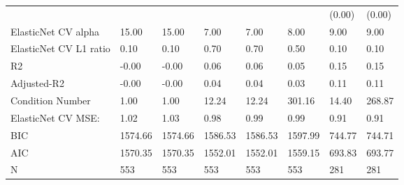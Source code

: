 \begin{table}
\begin{center}
\begin{tabular}{llllllll}
                                               &         &         &         &         &          & (0.00)    & (0.00)   \\
ElasticNet CV alpha                            & 15.00   & 15.00   & 7.00    & 7.00    & 8.00     & 9.00      & 9.00     \\
ElasticNet CV  L1 ratio                        & 0.10    & 0.10    & 0.70    & 0.70    & 0.50     & 0.10      & 0.10     \\
R2                                             & -0.00   & -0.00   & 0.06    & 0.06    & 0.05     & 0.15      & 0.15     \\
Adjusted-R2                                    & -0.00   & -0.00   & 0.04    & 0.04    & 0.03     & 0.11      & 0.11     \\
Condition Number                               & 1.00    & 1.00    & 12.24   & 12.24   & 301.16   & 14.40     & 268.87   \\
ElasticNet CV MSE:                             & 1.02    & 1.03    & 0.98    & 0.99    & 0.99     & 0.91      & 0.91     \\
BIC                                            & 1574.66 & 1574.66 & 1586.53 & 1586.53 & 1597.99  & 744.77    & 744.71   \\
AIC                                            & 1570.35 & 1570.35 & 1552.01 & 1552.01 & 1559.15  & 693.83    & 693.77   \\
N                                              & 553     & 553     & 553     & 553     & 553      & 281       & 281      \\
\hline
\end{tabular}
\end{center}
\end{table}